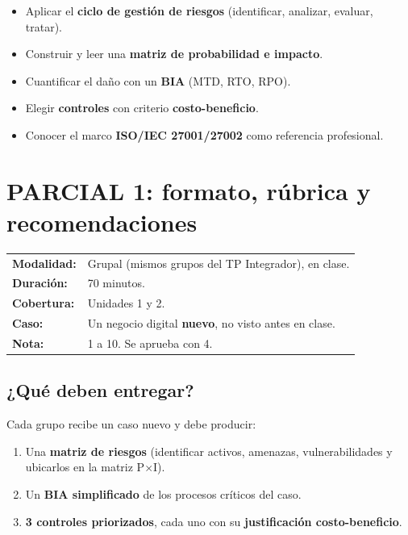 \documentclass[12pt,a4paper]{article}
\renewcommand{\arraystretch}{1.25}
\begin{document}
\begin{cajaConcepto}[title={Lo que nos llevamos de la Unidad 2}]
\begin{itemize}[leftmargin=2em]
    \item Aplicar el \textbf{ciclo de gesti\'on de riesgos} (identificar, analizar, evaluar, tratar).
    \item Construir y leer una \textbf{matriz de probabilidad e impacto}.
    \item Cuantificar el da\~no con un \textbf{BIA} (MTD, RTO, RPO).
    \item Elegir \textbf{controles} con criterio \textbf{costo-beneficio}.
    \item Conocer el marco \textbf{ISO/IEC 27001/27002} como referencia profesional.
\end{itemize}
\end{cajaConcepto}

\newpage
\section{PARCIAL 1: formato, r\'ubrica y recomendaciones}

\begin{cajaParcial}[title={Ficha t\'ecnica del Parcial 1}]
\renewcommand{\arraystretch}{1.5}
\begin{tabularx}{\textwidth}{>{\bfseries}p{4cm}X}
\textbf{Modalidad:} & Grupal (mismos grupos del TP Integrador), en clase. \\
\textbf{Duraci\'on:} & 70 minutos. \\
\textbf{Cobertura:} & Unidades 1 y 2. \\
\textbf{Caso:} & Un negocio digital \textbf{nuevo}, no visto antes en clase. \\
\textbf{Nota:} & 1 a 10. Se aprueba con 4. \\
\end{tabularx}
\end{cajaParcial}

\subsection{¿Qu\'e deben entregar?}
Cada grupo recibe un caso nuevo y debe producir:
\begin{enumerate}[leftmargin=2em]
    \item Una \textbf{matriz de riesgos} (identificar activos, amenazas, vulnerabilidades y ubicarlos en la matriz P$\times$I).
    \item Un \textbf{BIA simplificado} de los procesos cr\'iticos del caso.
    \item \textbf{3 controles priorizados}, cada uno con su \textbf{justificaci\'on costo-beneficio}.
\end{enumerate}
\end{document}
